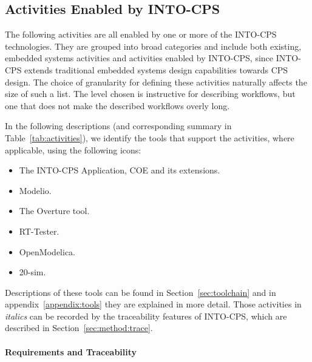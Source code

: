 \subsection{Activities Enabled by INTO-CPS}
\label{sec:method:workflows}


The following activities are all enabled by one or more of the INTO-CPS technologies. They are grouped into broad categories and include both existing, embedded systems activities and activities enabled by INTO-CPS, since INTO-CPS extends traditional embedded systems design capabilities towards CPS design. The choice of granularity for defining these activities naturally affects the size of such a list. The level chosen is instructive for describing workflows, but one that does not make the described workflows overly long.  %

In the following descriptions (and corresponding summary in Table~\ref{tab:activities}), we identify the tools that support the activities, where applicable, using the following icons:

\begin{itemize}[noitemsep]
\item[\INTOCPS] The INTO-CPS Application, COE and its extensions.
\item[\Modelio] Modelio.
\item[\Overture] The Overture tool.
\item[\RTTester] RT-Tester.
\item[\OpenModelica] OpenModelica.
\item[\TwentySim] 20-sim.
\end{itemize}

Descriptions of these tools can be found in Section~\ref{sec:toolchain} and in appendix~\ref{appendix:tools} they are explained in more detail. Those activities in \emph{italics} can be recorded by the traceability features of INTO-CPS, which are described in Section~\ref{sec:method:trace}.

\paragraph{Requirements and Traceability}

